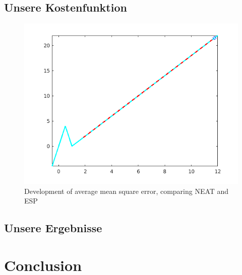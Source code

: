 \documentclass{hbrs-ecta-report}
\begin{document}
\subsection{Unsere Kostenfunktion}
\begin{figure}[ht!]
\centering
\includegraphics[width=\linewidth]{img/plot_fit_max.png}
\caption{Development of average mean square error, comparing NEAT and ESP}
\label{fig:1} 
\end{figure}
\subsection{Unsere Ergebnisse}



\FloatBarrier
\section{Conclusion}


\newpage



 
\end{document}
